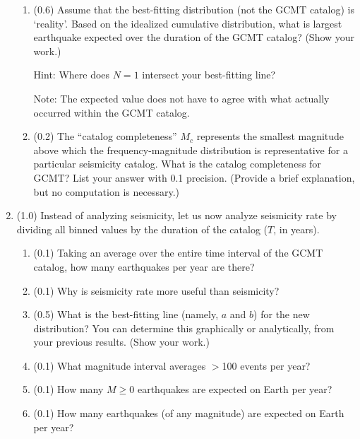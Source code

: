 \documentclass[11pt,titlepage,fleqn]{article}
\begin{document}
\begin{enumerate}
\begin{enumerate}

\item (0.6) Assume that the best-fitting distribution (not the GCMT catalog) is `reality'. Based on the idealized cumulative distribution, what is largest earthquake expected over the duration of the GCMT catalog? (Show your work.)

Hint: Where does $N = 1$ intersect your best-fitting line?

Note: The expected value does not have to agree with what actually occurred within the GCMT catalog.


\item (0.2) The ``catalog completeness'' \citep[\eg][]{WiemerWyss2000} $M_c$ represents the smallest magnitude above which the frequency-magnitude distribution is representative for a particular seismicity catalog. What is the catalog completeness for GCMT? List your answer with 0.1 precision. (Provide a brief explanation, but no computation is necessary.)

\end{enumerate}


\item (1.0) Instead of analyzing seismicity, let us now analyze seismicity rate by dividing all binned values by the duration of the catalog ($T$, in years).
%
\begin{enumerate}
\item (0.1) Taking an average over the entire time interval of the GCMT catalog, how many earthquakes per year are there?

\item (0.1) Why is seismicity rate more useful than seismicity?

\item (0.5) What is the best-fitting line (namely, $a$ and $b$) for the new distribution?
You can determine this graphically or analytically, from your previous results.
(Show your work.)

\item (0.1) What magnitude interval averages $>$100 events per year?

\item (0.1) How many $M \ge 0$ earthquakes are expected on Earth per year?

\item (0.1) How many earthquakes (of any magnitude) are expected on Earth per year?
\end{enumerate}


\end{enumerate}
\end{document}
